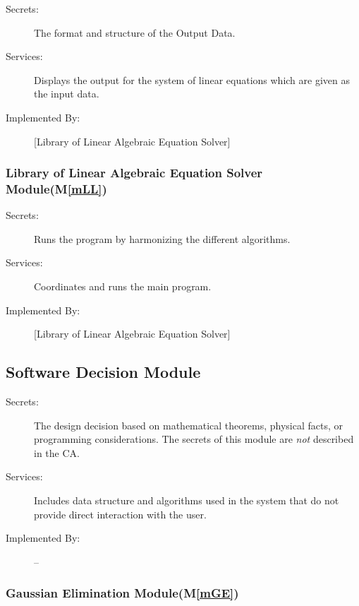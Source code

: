 \documentclass[12pt, titlepage]{article}
\newcommand{\mref}[1]{M\ref{#1}}
\begin{document}
\begin{description}
\item[Secrets:]The format and structure of the Output Data.
\item[Services:]Displays the output for the system of linear equations which are given as the input data.
\item[Implemented By:] [Library of Linear Algebraic Equation Solver]
\end{description}

\subsubsection{Library of Linear Algebraic Equation Solver Module(\mref{mLL})}

\begin{description}
\item[Secrets:]Runs the program by harmonizing the different algorithms.
\item[Services:]Coordinates and runs the main program.
\item[Implemented By:] [Library of Linear Algebraic Equation Solver]
\end{description}





\subsection{Software Decision Module}

\begin{description}
\item[Secrets:] The design decision based on mathematical theorems, physical
  facts, or programming considerations. The secrets of this module are
  \emph{not} described in the CA.
\item[Services:] Includes data structure and algorithms used in the system that
  do not provide direct interaction with the user. 
\item[Implemented By:] --
\end{description}

\subsubsection{Gaussian Elimination Module(\mref{mGE})}
\end{document}
